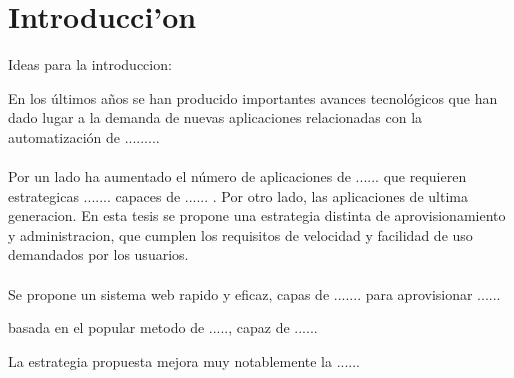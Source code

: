 \chapter{Introducci'on}

Ideas para la introduccion:

En los últimos años se han producido importantes avances tecnológicos que han dado lugar a la demanda de nuevas aplicaciones relacionadas con la automatización de .........\\
\\
Por un lado ha aumentado el número de aplicaciones de ...... que requieren estrategicas ....... capaces de ...... . Por otro lado, las aplicaciones  de ultima generacion. En esta tesis se propone una estrategia distinta de aprovisionamiento y administracion, que cumplen los requisitos de velocidad y facilidad de uso demandados por los usuarios.\\
\\
Se propone un sistema web rapido y eficaz, capas de ....... para aprovisionar ...... 

basada en el popular metodo de ....., capaz de ......

La estrategia propuesta mejora muy notablemente la ......



